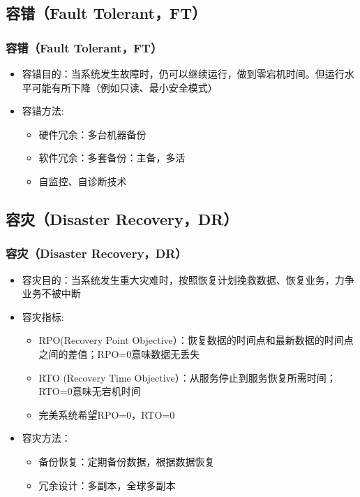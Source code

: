 \subsection{容错（Fault Tolerant，FT）} %
\begin{frame}[fragile]
    \frametitle{容错（Fault Tolerant，FT）}
\begin{itemize}
    \item 容错目的：当系统发生故障时，仍可以继续运行，做到零宕机时间。但运行水平可能有所下降（例如只读、最小安全模式） \pause
    \item 容错方法: 
 \begin{itemize}
    \item 硬件冗余：多台机器备份
    \item 软件冗余：多套备份：主备，多活
    \item 自监控、自诊断技术
\end{itemize}  \pause
\end{itemize}
\end{frame}



\subsection{容灾（Disaster Recovery，DR）} %
\begin{frame}[fragile]
    \frametitle{容灾（Disaster Recovery，DR）}
\begin{itemize}
    \item 容灾目的：当系统发生重大灾难时，按照恢复计划挽救数据、恢复业务，力争业务不被中断 \pause
    \item 容灾指标: 
 \begin{itemize}
    \item RPO(Recovery Point Objective）：恢复数据的时间点和最新数据的时间点之间的差值；RPO=0意味数据无丢失
    \item RTO (Recovery Time Objective）：从服务停止到服务恢复所需时间；RTO=0意味无宕机时间
    \item 完美系统希望RPO=0，RTO=0
\end{itemize}  \pause
   \item 容灾方法：
 \begin{itemize}
    \item 备份恢复：定期备份数据，根据数据恢复
    \item 冗余设计：多副本，全球多副本
\end{itemize} 
\end{itemize}
\end{frame}


